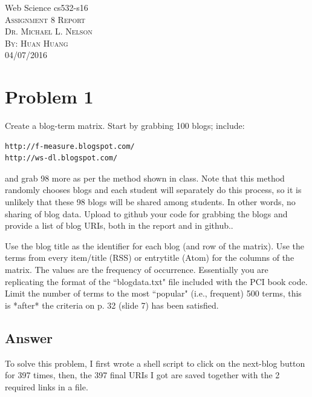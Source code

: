 \documentclass[12pt]{article}
\begin{document}
\begin{titlepage}
	\begin{center}
	\Huge{Web Science cs532-s16}\\
	[0.25in]
	\textsc{\Large Assignment 8 Report}\\
	\textsc{\normalsize Dr. Michael L. Nelson}\\
	[4.25in]
	\textsc{\normalsize By: Huan Huang}\\
	\large 04/07/2016\\
	
	
	\end{center}
\end{titlepage}
\newpage



\section*{Problem 1}

\noindent
Create a blog-term matrix.  Start by grabbing 100 blogs; include:

\begin{verbatim}
http://f-measure.blogspot.com/
http://ws-dl.blogspot.com/
\end{verbatim}

and grab 98 more as per the method shown in class.  Note that this
method randomly chooses blogs and each student will separately do
this process, so it is unlikely that these 98 blogs will be shared
among students.  In other words, no sharing of blog data.  Upload
to github your code for grabbing the blogs and provide a list of
blog URIs, both in the report and in github..

Use the blog title as the identifier for each blog (and row of the
matrix).  Use the terms from every item/title (RSS) or entry\/title
(Atom) for the columns of the matrix.  The values are the frequency
of occurrence.  Essentially you are replicating the format of the
``blogdata.txt" file included with the PCI book code.  Limit the
number of terms to the most ``popular" (i.e., frequent) 500 terms,
this is *after* the criteria on p. 32 (slide 7) has been satisfied.


\subsection*{Answer}
To solve this problem, I first wrote a shell script to click on the next-blog button for 397 times, then, the 397 final URIs I got are saved together with the 2 required links in a file.
\end{document}
